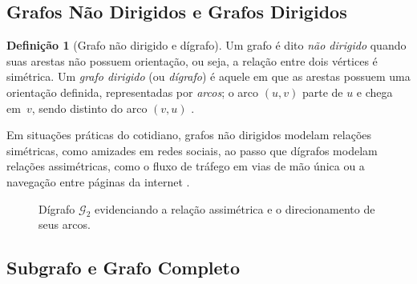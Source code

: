 \documentclass[
  12pt,
  oneside,
  a4paper,
  english,
  brazilian
  ]{abntex2}
\theoremstyle{definition}
\newtheorem{definicao}{Definição}[chapter]
\begin{document}
\subsection{Grafos Não Dirigidos e Grafos Dirigidos}

\begin{definicao}[Grafo não dirigido e dígrafo]
\label{def:dirigido}
  Um grafo é dito \textit{não dirigido} quando suas arestas não possuem
  orientação, ou seja, a relação entre dois vértices é simétrica. Um
  \textit{grafo dirigido} (ou \textit{dígrafo}) é aquele em que as arestas
  possuem uma orientação definida, representadas por \textit{arcos}; o arco
  $(u, v)$ parte de $u$ e chega em~$v$, sendo distinto do arco $(v, u)$
  \cite{cormen2009}.
\end{definicao}

Em situações práticas do cotidiano, grafos não dirigidos modelam relações
simétricas, como amizades em redes sociais, ao passo que dígrafos modelam
relações assimétricas, como o fluxo de tráfego em vias de mão única ou a
navegação entre páginas da internet \cite{rosen2012}.

\begin{figure}[htbp]
    \centering
    \caption{Dígrafo $\mathcal{G}_2$ evidenciando a relação assimétrica e o direcionamento de seus arcos.}
    \label{fig:digrafo}
\end{figure}

\subsection{Subgrafo e Grafo Completo}
\end{document}

